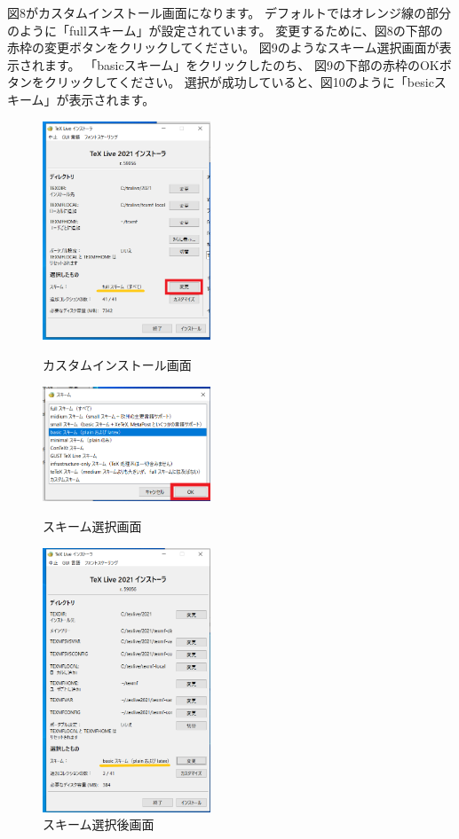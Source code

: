 \documentclass[dvipdfmx]{jsarticle}
\begin{document}
図8がカスタムインストール画面になります。
デフォルトではオレンジ線の部分のように「fullスキーム」が設定されています。
変更するために、図8の下部の赤枠の変更ボタンをクリックしてください。
図9のようなスキーム選択画面が表示されます。
「basicスキーム」をクリックしたのち、
図9の下部の赤枠のOKボタンをクリックしてください。
選択が成功していると、図10のように「besicスキーム」が表示されます。

\begin{figure}[H]
    \begin{minipage}[b]{0.33\linewidth}
        \centering
        \includegraphics[width=5cm]{images/TeXLive2021_2.png}
        \caption{カスタムインストール画面}
    \end{minipage}
    \begin{minipage}[b]{0.33\linewidth}
        \centering
        \includegraphics[width=5cm]{images/TeXLive2021_3.png}
        \caption{スキーム選択画面}
    \end{minipage}
    \begin{minipage}[b]{0.33\linewidth}
        \centering
        \includegraphics[width=5cm]{images/TeXLive2021_4.png}
        \caption{スキーム選択後画面}
    \end{minipage}
\end{figure}
\end{document}
